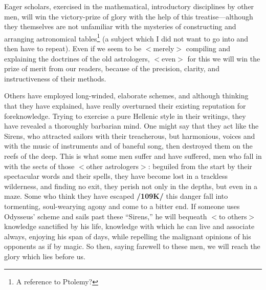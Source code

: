 Eager scholars, exercised in the mathematical, introductory disciplines by other men, will win the victory-prize of glory with the help of this treatise—although they themselves are not
unfamiliar with the mysteries of constructing and arranging astronomical tables\footnote{A reference to Ptolemy?} (a subject which I did not want to go into and then have to repeat). Even if we seem to be $<$merely$>$ compiling and explaining the doctrines of the old astrologers, $<$even$>$ for this we will win the prize of merit from our readers, because of the precision, clarity, and instructiveness of their methods.

Others have employed long-winded, elaborate schemes, and although thinking that they have explained, have really overturned their existing reputation for foreknowledge. Trying to exercise a pure Hellenic style in their writings, they have revealed a thoroughly barbarian mind. One might say that they
act like the Sirens, who attracted sailors with their treacherous, but harmonious, voices and with the music
of instruments and of baneful song, then destroyed them on the reefs of the deep. This is what some men suffer and have suffered, men who fall in with the sects of those $<$other astrologers$>$: beguiled from the start by their spectacular words and their spells, they have become lost in a trackless wilderness, and finding no exit, they perish not only in the depths, but even in a maze. Some who think they have escaped \textbf{/109K/} this danger fall into tormenting, soul-wearying agony and come to a bitter end. If someone uses Odysseus’
scheme and sails past these “Sirens,” he will bequeath $<$to others$>$ knowledge sanctified by his life, knowledge with which he can live and associate always, enjoying his span of days, while repelling the malignant opinions of his opponents as if by magic. So then, saying farewell to these men, we will reach the glory which lies before us.

\newpage